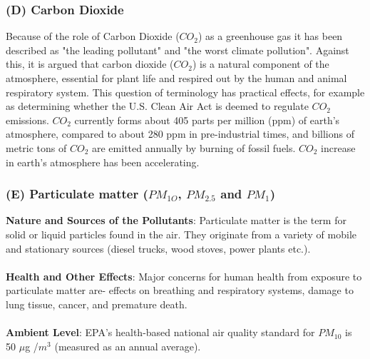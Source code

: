 \subsubsection{(D) Carbon Dioxide}
Because of the role of Carbon Dioxide ($CO_2$) as a greenhouse gas it has been described as "the leading pollutant" and "the worst climate pollution". Against this, it is argued that carbon dioxide ($CO_2$) is a natural component of the atmosphere, essential for plant life and respired out by the human and animal respiratory system. This question of terminology has practical effects, for example as determining whether the U.S. Clean Air Act is deemed to regulate $CO_2$ emissions. $CO_2$ currently forms about 405 parts per million (ppm) of earth's atmosphere, compared to about 280 ppm in pre-industrial times, and billions of metric tons of $CO_2$ are emitted annually by burning of fossil fuels. $CO_2$ increase in earth's atmosphere has been accelerating.

\subsubsection{(E) Particulate matter ($PM_{1O}$, $PM_{2.5}$ and $PM_1$)}
\textbf{Nature and Sources of the Pollutants}: Particulate matter is the term for solid or liquid particles found in the air. They originate from a variety of mobile and stationary sources (diesel trucks, wood stoves, power plants etc.).
\\
\\
\textbf{Health and Other Effects}: Major concerns for human health from exposure to particulate matter are- effects on breathing and respiratory systems, damage to lung tissue, cancer, and premature death.
\\
\\ 
\textbf{Ambient Level}: EPA's health-based national air quality standard for $PM_{10}$ is 50  $\mu$g /$m^3$ (measured as an annual average).

